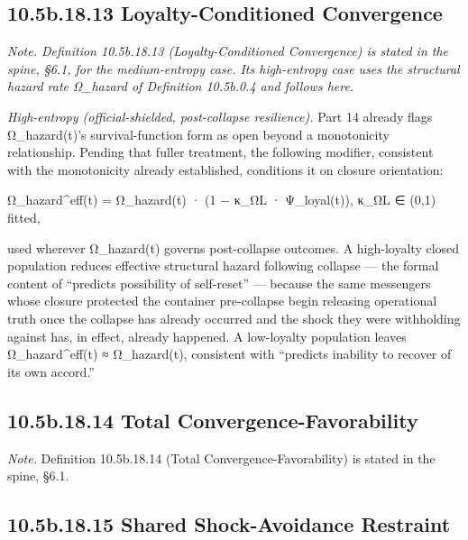 \documentclass[
]{article}
\begin{document}
\hypertarget{b.18.13-loyalty-conditioned-convergence}{%
\subsection{10.5b.18.13 Loyalty-Conditioned
Convergence}\label{b.18.13-loyalty-conditioned-convergence}}

\emph{Note. Definition 10.5b.18.13 (Loyalty-Conditioned Convergence) is
stated in the spine, §6.1, for the medium-entropy case. Its high-entropy
case uses the structural hazard rate Ω\_hazard of Definition 10.5b.0.4
and follows here.}

\emph{High-entropy (official-shielded, post-collapse resilience).} Part
14 already flags Ω\_hazard(t)'s survival-function form as open beyond a
monotonicity relationship. Pending that fuller treatment, the following
modifier, consistent with the monotonicity already established,
conditions it on closure orientation:

Ω\_hazard\^{}eff(t) = Ω\_hazard(t) · (1 − κ\_ΩL · Ψ\_loyal(t)), κ\_ΩL ∈
(0,1) fitted,

used wherever Ω\_hazard(t) governs post-collapse outcomes. A
high-loyalty closed population reduces effective structural hazard
following collapse --- the formal content of ``predicts possibility of
self-reset'' --- because the same messengers whose closure protected the
container pre-collapse begin releasing operational truth once the
collapse has already occurred and the shock they were withholding
against has, in effect, already happened. A low-loyalty population
leaves Ω\_hazard\^{}eff(t) ≈ Ω\_hazard(t), consistent with ``predicts
inability to recover of its own accord.''

\hypertarget{b.18.14-total-convergence-favorability}{%
\subsection{10.5b.18.14 Total
Convergence-Favorability}\label{b.18.14-total-convergence-favorability}}

\emph{Note.} Definition 10.5b.18.14 (Total Convergence-Favorability) is
stated in the spine, §6.1.

\hypertarget{b.18.15-shared-shock-avoidance-restraint}{%
\subsection{10.5b.18.15 Shared Shock-Avoidance
Restraint}\label{b.18.15-shared-shock-avoidance-restraint}}
\end{document}
